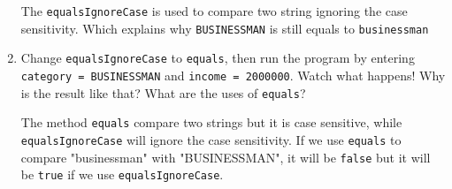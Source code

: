 \documentclass[12pt,titlepage]{article}
\begin{document}
\begin{enumerate}
{        The \texttt{equalsIgnoreCase} is used to compare two string ignoring the case sensitivity.
        Which explains why \texttt{BUSINESSMAN} is still equals to \texttt{businessman}
    }
    \item {
        Change \texttt{equalsIgnoreCase} to \texttt{equals}, then run the program by entering 
        \texttt{category = BUSINESSMAN} and \texttt{income = 2000000}. Watch what happens!
        Why is the result like that? What are the uses of \texttt{equals}?

        The method \texttt{equals} compare two strings but it is case sensitive, while \texttt{equalsIgnoreCase} will
        ignore the case sensitivity. If we use \texttt{equals} to compare "businessman" with "BUSINESSMAN",
        it will be \texttt{false} but it will be \texttt{true} if we use \texttt{equalsIgnoreCase}.
    }
\end{enumerate}
\end{document}
